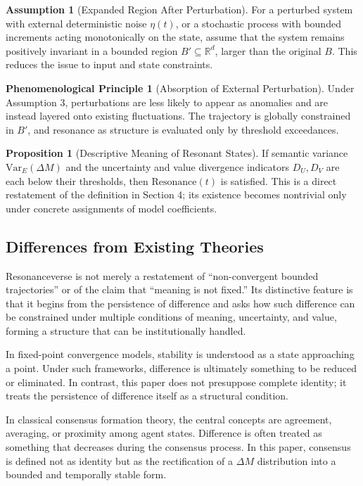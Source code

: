 \documentclass[11pt,a4paper]{article}
\theoremstyle{definition}
\newtheorem{proposition}{Proposition}[section]
\newtheorem{assumption}{Assumption}[section]
\newtheorem{phenomenological}{Phenomenological Principle}[section]
\begin{document}
\begin{assumption}[Expanded Region After Perturbation]
For a perturbed system with external deterministic noise $\eta(t)$, or a stochastic process with bounded increments acting monotonically on the state, assume that the system remains positively invariant in a bounded region $B' \subseteq \mathbb{R}^d$, larger than the original $B$. This reduces the issue to input and state constraints.
\end{assumption}

\begin{phenomenological}[Absorption of External Perturbation]
Under Assumption 3, perturbations are less likely to appear as anomalies and are instead layered onto existing fluctuations. The trajectory is globally constrained in $B'$, and resonance as structure is evaluated only by threshold exceedances.
\end{phenomenological}

\begin{proposition}[Descriptive Meaning of Resonant States]
If semantic variance $\text{Var}_E(\Delta M)$ and the uncertainty and value divergence indicators $D_U, D_V$ are each below their thresholds, then $\text{Resonance}(t)$ is satisfied. This is a direct restatement of the definition in Section 4; its existence becomes nontrivial only under concrete assignments of model coefficients.
\end{proposition}

\subsection{Differences from Existing Theories}

Resonanceverse is not merely a restatement of ``non-convergent bounded trajectories'' or of the claim that ``meaning is not fixed.'' Its distinctive feature is that it begins from the persistence of difference and asks how such difference can be constrained under multiple conditions of meaning, uncertainty, and value, forming a structure that can be institutionally handled.

In fixed-point convergence models, stability is understood as a state approaching a point. Under such frameworks, difference is ultimately something to be reduced or eliminated. In contrast, this paper does not presuppose complete identity; it treats the persistence of difference itself as a structural condition.

In classical consensus formation theory, the central concepts are agreement, averaging, or proximity among agent states. Difference is often treated as something that decreases during the consensus process. In this paper, consensus is defined not as identity but as the rectification of a $\Delta M$ distribution into a bounded and temporally stable form.
\end{document}
